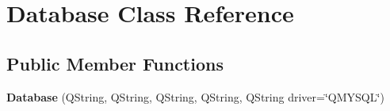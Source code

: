 \hypertarget{class_database}{\section{Database Class Reference}
\label{class_database}
}
\subsection*{Public Member Functions}
\begin{DoxyCompactItemize}
\item 
\hypertarget{class_database_aae309ecd574119ae26ea06e45fc663d8}{{\bfseries Database} (Q\+String, Q\+String, Q\+String, Q\+String, Q\+String driver=\char`\"{}Q\+M\+Y\+S\+Q\+L\char`\"{})}\label{class_database_aae309ecd574119ae26ea06e45fc663d8}


\end{DoxyCompactItemize}
